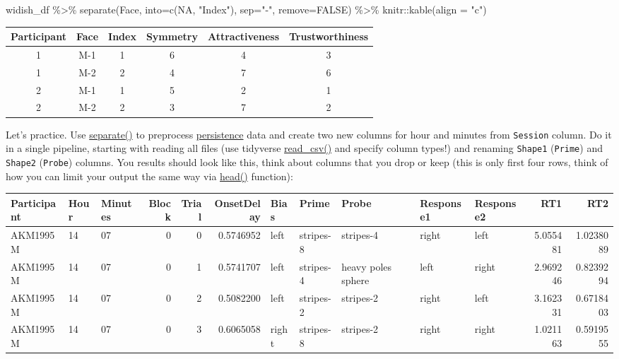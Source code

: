 \documentclass[
]{book}
\newenvironment{Shaded}{\begin{snugshade}}{\end{snugshade}}
\newcommand{\AttributeTok}[1]{\textcolor[rgb]{0.77,0.63,0.00}{#1}}
\newcommand{\ConstantTok}[1]{\textcolor[rgb]{0.00,0.00,0.00}{#1}}
\newcommand{\FunctionTok}[1]{\textcolor[rgb]{0.00,0.00,0.00}{#1}}
\newcommand{\NormalTok}[1]{#1}
\newcommand{\SpecialCharTok}[1]{\textcolor[rgb]{0.00,0.00,0.00}{#1}}
\newcommand{\StringTok}[1]{\textcolor[rgb]{0.31,0.60,0.02}{#1}}
\begin{document}
\begin{Shaded}
\begin{Highlighting}[]
\NormalTok{widish\_df }\SpecialCharTok{\%\textgreater{}\%}
  \FunctionTok{separate}\NormalTok{(Face, }\AttributeTok{into=}\FunctionTok{c}\NormalTok{(}\ConstantTok{NA}\NormalTok{, }\StringTok{"Index"}\NormalTok{), }\AttributeTok{sep=}\StringTok{"{-}"}\NormalTok{, }\AttributeTok{remove=}\ConstantTok{FALSE}\NormalTok{) }\SpecialCharTok{\%\textgreater{}\%}
\NormalTok{  knitr}\SpecialCharTok{::}\FunctionTok{kable}\NormalTok{(}\AttributeTok{align =} \StringTok{"c"}\NormalTok{)}
\end{Highlighting}
\end{Shaded}

\begin{tabular}{c|c|c|c|c|c}
\hline
Participant & Face & Index & Symmetry & Attractiveness & Trustworthiness\\
\hline
1 & M-1 & 1 & 6 & 4 & 3\\
\hline
1 & M-2 & 2 & 4 & 7 & 6\\
\hline
2 & M-1 & 1 & 5 & 2 & 1\\
\hline
2 & M-2 & 2 & 3 & 7 & 2\\
\hline
\end{tabular}

Let's practice. Use \href{https://tidyr.tidyverse.org/reference/separate.html}{separate()} to preprocess \href{data/persistence.zip}{persistence} data and create two new columns for hour and minutes from \texttt{Session} column. Do it in a single pipeline, starting with reading all files (use tidyverse \href{https://readr.tidyverse.org/reference/read_delim.html}{read\_csv()} and specify column types!) and renaming \texttt{Shape1} (\texttt{Prime}) and \texttt{Shape2} (\texttt{Probe}) columns. You results should look like this, think about columns that you drop or keep (this is only first four rows, think of how you can limit your output the same way via \href{https://stat.ethz.ch/R-manual/R-devel/library/utils/html/head.html}{head()} function):

\begin{tabular}{l|l|l|r|r|r|l|l|l|l|l|r|r}
\hline
Participant & Hour & Minutes & Block & Trial & OnsetDelay & Bias & Prime & Probe & Response1 & Response2 & RT1 & RT2\\
\hline
AKM1995M & 14 & 07 & 0 & 0 & 0.5746952 & left & stripes-8 & stripes-4 & right & left & 5.055481 & 1.0238089\\
\hline
AKM1995M & 14 & 07 & 0 & 1 & 0.5741707 & left & stripes-4 & heavy poles sphere & left & right & 2.969246 & 0.8239294\\
\hline
AKM1995M & 14 & 07 & 0 & 2 & 0.5082200 & left & stripes-2 & stripes-2 & right & left & 3.162331 & 0.6718403\\
\hline
AKM1995M & 14 & 07 & 0 & 3 & 0.6065058 & right & stripes-8 & stripes-2 & right & right & 1.021163 & 0.5919555\\
\hline
\end{tabular}
\end{document}
